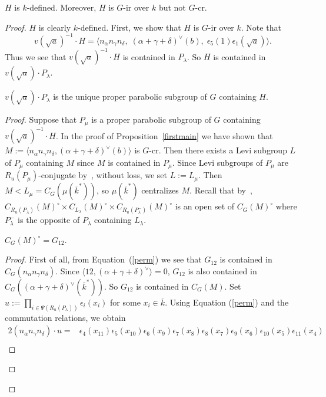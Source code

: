 \begin{prop}\label{secondmain}
$H$ is $k$-defined. Moreover, $H$ is $G$-ir over $k$ but not $G$-cr. 
\end{prop}
\begin{proof}
$H$ is clearly $k$-defined. First, we show that $H$ is $G$-ir over $k$. Note that
\begin{equation*}
v(\sqrt a)^{-1}\cdot H = \langle n_\alpha n_\gamma n_\delta, \; (\alpha+\gamma+\delta)^{\vee}(b),\; \epsilon_{5}(1)\epsilon_{1}(\sqrt a)\rangle.
\end{equation*}
Thus we see that $v(\sqrt a)^{-1}\cdot H$ is contained in $P_\lambda$. So $H$ is contained in $v(\sqrt a)\cdot P_\lambda$. 

\begin{lem}\label{uniquepara}
$v(\sqrt a)\cdot P_\lambda$ is the unique proper parabolic subgroup of $G$ containing $H$.
\end{lem}
\begin{proof}
Suppose that $P_\mu$ is a proper parabolic subgroup of $G$ containing $v(\sqrt a)^{-1}\cdot H$. In the proof of Proposition~\ref{firstmain} we have shown that $M:=\langle n_\alpha n_\gamma n_\delta, (\alpha+\gamma+\delta)^{\vee}(b)\rangle$ is $G$-cr. Then there exists a Levi subgroup $L$ of $P_\mu$ containing $M$ since $M$ is contained in $P_\mu$. Since Levi subgroups of $P_\mu$ are $R_u(P_\mu)$-conjugate by~\cite[Lem.~2.5()]{Bate-uniform-TransAMS}, without loss, we set $L:=L_\mu$. Then $M<L_\mu=C_G(\mu(\overline k^*))$, so $\mu(\overline k^*)$ centralizes $M$. Recall that by~\cite[Thm.~13.4.2]{Springer-book}, $C_{R_u(P_\lambda)}(M)^{\circ}\times C_{L_\lambda}(M)^{\circ}\times C_{R_u(P_\lambda^{-})}(M)^{\circ}$ is an open set of $C_G(M)^{\circ}$ where $P_\lambda^{-}$ is the opposite of $P_\lambda$ containing $L_\lambda$.  
\begin{lem}\label{centralizerofM}
$C_G(M)^{\circ}=G_{12}$.
\end{lem}
\begin{proof}
First of all, from Equation~(\ref{perm}) we see that $G_{12}$ is contained in $C_G(n_\alpha n_\gamma n_\delta)$. Since $\langle 12, (\alpha+\gamma+\delta)^{\vee} \rangle=0$, $G_{12}$ is also contained in $C_G((\alpha+\gamma+\delta)^{\vee}(\overline k^*))$. So $G_{12}$ is contained in $C_G(M)$. Set $u:=\prod_{i\in \Psi(R_u(P_\lambda))}\epsilon_{i}(x_i)$ for some $x_i \in \overline k$. Using Equation (\ref{perm}) and the commutation relations, we obtain
\begin{alignat*}{2}
(n_\alpha n_\gamma n_\delta)\cdot u =& \epsilon_{4}(x_{11})\epsilon_{5}(x_{10})\epsilon_{6}(x_9)\epsilon_7(x_{8})\epsilon_8(x_{7})\epsilon_9(x_6)\epsilon_{10}(x_{5})\epsilon_{11}(x_4)\\

\end{alignat*}
\end{proof}
\end{proof}
\end{proof}
